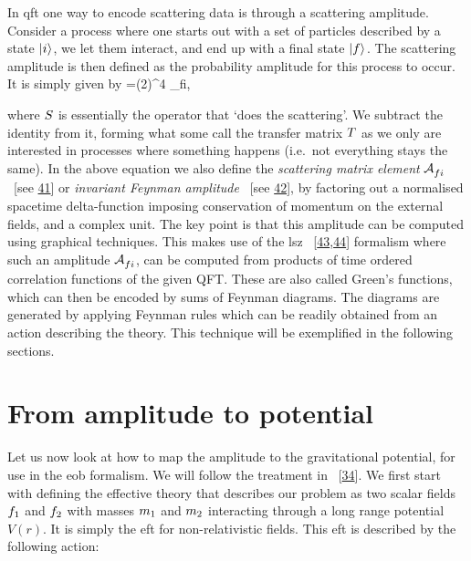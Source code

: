 \documentclass[
  10pt,
  a4paper,
  DIV=11,
  numbers=noendperiod,
  oneside]{scrreprt}
\let\[\relax \let\]\relax %
\DeclareRobustCommand{\[}{\begin{equation}}
\DeclareRobustCommand{\]}{\end{equation}}
\begin{document}
In \gls{qft} one way to encode scattering data is through a scattering
amplitude. Consider a process where one starts out with a set of
particles described by a state \(\ket{i}\), we let them interact, and
end up with a final state \(\ket{f}\). The scattering amplitude is then
defined as the probability amplitude for this process to occur. It is
simply given by
\[=(2\pi)^4 \im \ampl_{fi},\]

where \(\Smat\) is essentially the operator that `does the scattering'.
We subtract the identity from it, forming what some call the transfer
matrix \(\Tmat\) as we only are interested in processes where something
happens (i.e.~not everything stays the same). In the above equation we
also define the \emph{scattering matrix element} \(\ampl_{fi}\) ~{[}see
\protect\hyperlink{ref-Srednicki:2007}{41}{]} or \emph{invariant Feynman
amplitude} ~{[}see \protect\hyperlink{ref-Coleman:2018a}{42}{]}, by
factoring out a normalised spacetime delta-function imposing
conservation of momentum on the external fields, and a complex unit. The
key point is that this amplitude can be computed using graphical
techniques. This makes use of the \gls{lsz}
~{[}\protect\hyperlink{ref-Lehmann:1954rq}{43},\protect\hyperlink{ref-Collins:2019ozc}{44}{]}
formalism where such an amplitude \(\ampl_{fi}\), can be computed from
products of time ordered correlation functions of the given QFT. These
are also called Green's functions, which can then be encoded by sums of
Feynman diagrams. The diagrams are generated by applying Feynman rules
which can be readily obtained from an action describing the theory. This
technique will be exemplified in the following sections.

\hypertarget{sec-amp2pot}{%
\section{From amplitude to potential}\label{sec-amp2pot}}

Let us now look at how to map the amplitude to the gravitational
potential, for use in the \gls{eob} formalism. We will follow the
treatment in ~{[}\protect\hyperlink{ref-Cheung:2018wkq}{34}{]}. We first
start with defining the effective theory that describes our problem as
two scalar fields \(\wf[1]\) and \(\wf[2]\) with masses \(\mass[1]\) and
\(\mass[2]\) interacting through a long range potential \(V(r)\). It is
simply the \gls{eft} for non-relativistic fields. This \gls{eft} is
described by the following action:
\end{document}
